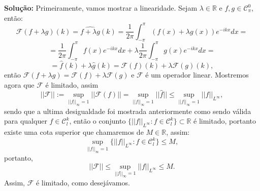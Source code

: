 \documentclass{article}
\begin{document}
\begin{enumerate}
\begin{enumerate}
			\textbf{Solução:} Primeiramente, vamos mostrar a linearidade. Sejam $\lambda \in \mathbb{R}$ e $f, g \in \mathcal{C}^{0}_{\pi}$, então:
			$$
			\mathcal{F}(f+\lambda g)(k) = \widehat{f+\lambda g}(k) =  \frac{1}{2\pi}\int_{-\pi}^{\pi} (f(x)+\lambda g(x))e^{-ikx}dx = 
			$$
			$$
			= \frac{1}{2\pi}\int_{-\pi}^{\pi} f(x)e^{-ikx}dx + \lambda \frac{1}{2\pi}\int_{-\pi}^{\pi} g(x)e^{-ikx}dx = 
			$$
			$$
			= \hat{f}(k) +\lambda \hat{g}(k) = \mathcal{F}(f)(k) + \lambda \mathcal{F}(g)(k),
			$$
			então $\mathcal{F}(f+\lambda g) = \mathcal{F}(f) + \lambda \mathcal{F}(g)$ e $\mathcal{F}$ é um operador linear. Mostremos agora que $\mathcal{F}$ é limitado, assim
			$$
			||\mathcal{F}|| := \sup_{||f||_{\infty}=1} ||\mathcal{F}(f)|| = \sup_{||f||_{\infty}=1} ||\hat{f}|| \leq \sup_{||f||_{\infty}=1} ||f||_{L^{\infty}},
			$$
			sendo que a ultima desigualdade foi mostrada anteriormente como sendo válida para qualquer $f \in \mathcal{C}^{k}_{l}$, então o conjunto $\{||f||_{L^{\infty}}: f \in \mathcal{C}^{k}_{l} \} \subset \mathbb{R} $ é limitado, portanto existe uma cota superior que chamaremos de $M \in \mathbb{R}$, assim:
			$$
			\sup\limits_{||f||_{\infty}=1} \{||f||_{L^{\infty}}: f \in \mathcal{C}^{k}_{l} \} \leq M,
			$$
			portanto,
			$$
			||\mathcal{F}|| \leq \sup_{||f||_{\infty}=1} ||f||_{L^{\infty}} \leq M.
			$$
			Assim, $\mathcal{F}$ é limitado, como desejávamos.
			
		\end{enumerate}
		
	\end{enumerate}
		
\end{document}
